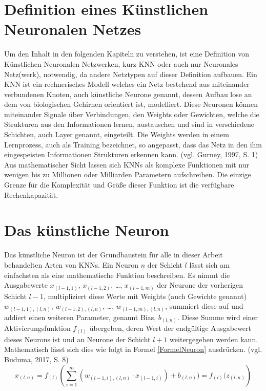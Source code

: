 \documentclass[a4paper,12pt,ngerman,oneside]{scrreprt}	%
\begin{document}
		\section{Definition eines Künstlichen Neuronalen Netzes}\label{DefKNN}
		Um den Inhalt in den folgenden Kapiteln zu verstehen, ist eine Definition von Künstlichen Neuronalen Netzwerken, kurz \gls{KNN} oder auch nur Neuronales Netz(werk), notwendig, da andere Netztypen auf dieser Definition aufbauen. Ein KNN ist ein rechnerisches Modell welches ein Netz bestehend aus miteinander verbundenen Knoten, auch künstliche Neurone genannt, dessen Aufbau lose an dem von biologischen Gehirnen orientiert ist, modelliert. Diese Neuronen können miteinander Signale über Verbindungen, den Weights oder Gewichten, welche die Strukturen aus den Informationen lernen, austauschen und sind in verschiedene Schichten, auch Layer genannt, eingeteilt. Die Weights werden in einem Lernprozess, auch als Training bezeichnet, so angepasst, dass das Netz in den ihm eingespeisten Informationen Strukturen erkennen kann. (vgl. Gurney, 1997, S. 1) Aus mathematischer Sicht lassen sich KNNs als komplexe Funktionen mit nur wenigen bis zu Millionen oder Milliarden Parametern aufschreiben. Die einzige Grenze für die Komplexität und Größe dieser Funktion ist die verfügbare Rechenkapazität. 
		\section{Das künstliche Neuron}\label{DefKN}
		Das künstliche Neuron ist der Grundbaustein für alle in dieser Arbeit behandelten Arten von KNNs. Ein Neuron $n$ der Schicht $l$ lässt sich am einfachsten als eine mathematische Funktion beschreiben. Es nimmt die Ausgabewerte $x_{(l-1,1)}$, $x_{(l-1,2)}$, …, $x_{(l-1,m)}$ der Neurone der vorherigen Schicht $l-1$, multipliziert diese Werte mit Weights (auch Gewichte genannt) $w_{(l-1,1),(l,n)}$, $w_{(l-1,2),(l,n)}$, …, $w_{(l-1,m),(l,n)}$, summiert diese auf und addiert einen weiteren Parameter, genannt Bias, $b_{(l,n)}$. Diese Summe wird einer Aktivierungsfunktion $f_{(l)}$ übergeben, deren Wert der endgültige Ausgabewert dieses Neurons ist und an Neurone der Schicht $l+1$ weitergegeben werden kann. Mathematisch lässt sich dies wie folgt in Formel \ref{FormelNeuron} ausdrücken. (vgl. Buduma, 2017, S. 8)
		\vspace*{-0.5cm}
			\begin{equation}\label{FormelNeuron}
				x_{(l,n)} = f_{(l)} \left(\sum_{i=1}^{m}(w_{(l-1,i),(l,n)} \cdot x_{(l-1,i)}) + b_{(l,n)}) = f_{(l)}(z_{(l,n)}\right)
			\end{equation}
\end{document}

